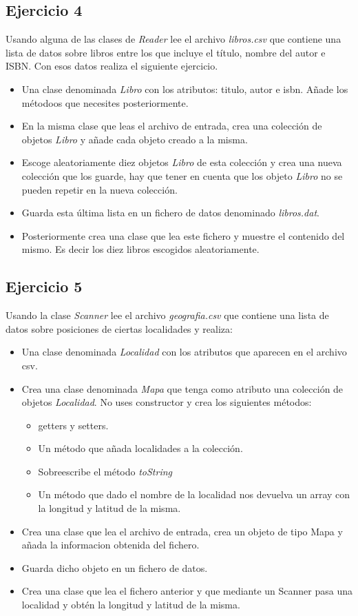 \documentclass[4paper]{article}
\begin{document}
\subsection*{Ejercicio 4}
Usando alguna de las clases de \emph{Reader} lee el archivo \emph{libros.csv} que contiene una lista de datos sobre libros entre los que incluye el título, nombre del autor e ISBN. Con esos datos realiza el siguiente ejercicio. 
\begin{itemize}
\item Una clase denominada \emph{Libro} con los atributos: titulo, autor e isbn. Añade los métodoos que necesites posteriormente.
\item En la misma clase que leas el archivo de entrada, crea una colección de objetos \emph{Libro} y añade cada objeto creado a la misma.
\item Escoge aleatoriamente diez objetos \emph{Libro} de esta colección y crea una nueva colección que los guarde, hay que tener en cuenta que los objeto \emph{Libro} no se pueden repetir en la nueva colección.
\item Guarda esta última lista en un fichero de datos denominado \emph{libros.dat}.
\item Posteriormente crea una clase que lea este fichero y muestre el contenido del mismo. Es decir los diez libros escogidos aleatoriamente.
\end{itemize}

\subsection*{Ejercicio 5}
Usando la clase  \emph{Scanner}  lee el archivo \emph{geografia.csv} que contiene una lista de datos sobre posiciones de ciertas localidades y realiza:
\begin{itemize}
\item Una clase denominada \emph{Localidad} con los atributos que aparecen en el archivo csv.
\item Crea una clase denominada \emph{Mapa} que tenga como atributo una colección de objetos \emph{Localidad}. No uses constructor y crea los siguientes métodos:
\begin{itemize}
\item getters y setters.
\item Un método que añada localidades a la colección.
\item Sobreescribe el método \emph{toString}
\item Un método que dado el nombre de la localidad nos devuelva un array con la longitud y latitud de la misma.
\end{itemize}
\item Crea una clase que lea el archivo de entrada, crea un objeto de tipo Mapa y añada la informacion obtenida del fichero.
\item Guarda dicho objeto en un fichero de datos.
\item Crea una clase que lea el fichero anterior y que mediante un Scanner pasa una localidad y obtén la longitud y latitud de la misma.
\end{itemize}
\end{document}
